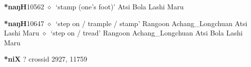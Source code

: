   \begin{list}{}{\leftmargin=1.5em \itemindent=-1.5em}
  \item {\footnotesize \textbf{*naŋH}}{\tiny 10562}
         $\diamond$~`stamp (one's foot)'
         Atsi 
\hspace{1ex}
         Bola 
\hspace{1ex}
         Lashi 
\hspace{1ex}
         Maru 
  \item {\footnotesize \textbf{*naŋH}}{\tiny 10647}
\hspace{1ex}
         $\diamond$~`step on / trample / stamp'
         Rangoon 
\hspace{1ex}
         Achang\_Longchuan 
\hspace{1ex}
         Atsi 
\hspace{1ex}
         Lashi 
\hspace{1ex}
         Maru 
\hspace{1ex}
         $\diamond$~`step on / tread'
         Rangoon 
\hspace{1ex}
         Achang\_Longchuan 
\hspace{1ex}
         Atsi 
\hspace{1ex}
         Bola 
\hspace{1ex}
         Lashi 
\hspace{1ex}
         Maru 
  \end{list}
\item
\textbf{*niX}
?
  {\tiny crossid 2927, 11759}
